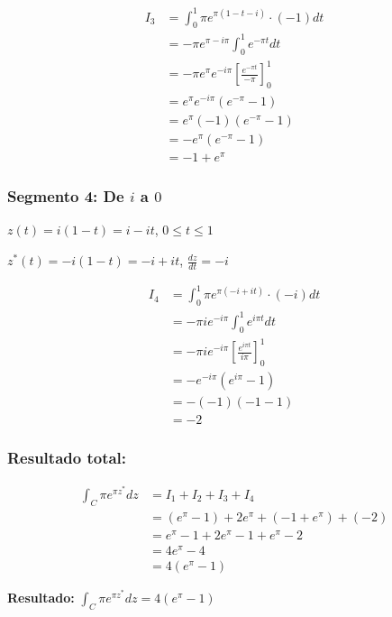 \documentclass{article}
\begin{document}
\begin{align*}
I_3 &= \int_0^1 \pi e^{\pi(1 - t - i)} \cdot (-1) dt \\
    &= -\pi e^{\pi - i\pi} \int_0^1 e^{-\pi t} dt \\
    &= -\pi e^{\pi} e^{-i\pi} \left[\frac{e^{-\pi t}}{-\pi}\right]_0^1 \\
    &= e^{\pi} e^{-i\pi} (e^{-\pi} - 1) \\
    &= e^{\pi} (-1) (e^{-\pi} - 1) \\
    &= -e^{\pi} (e^{-\pi} - 1) \\
    &= -1 + e^{\pi}
\end{align*}

\subsubsection*{Segmento 4: De $i$ a $0$}

$z(t) = i(1 - t) = i - it$, $0 \leq t \leq 1$

$z^*(t) = -i(1 - t) = -i + it$, $\frac{dz}{dt} = -i$

\begin{align*}
I_4 &= \int_0^1 \pi e^{\pi(-i + it)} \cdot (-i) dt \\
    &= -\pi i e^{-i\pi} \int_0^1 e^{i\pi t} dt \\
    &= -\pi i e^{-i\pi} \left[\frac{e^{i\pi t}}{i\pi}\right]_0^1 \\
    &= -e^{-i\pi} (e^{i\pi} - 1) \\
    &= -(-1) (-1 - 1) \\
    &= -2
\end{align*}

\subsubsection*{Resultado total:}

\begin{align*}
\int_C \pi e^{\pi z^*} dz &= I_1 + I_2 + I_3 + I_4 \\
                          &= (e^{\pi} - 1) + 2e^{\pi} + (-1 + e^{\pi}) + (-2) \\
                          &= e^{\pi} - 1 + 2e^{\pi} - 1 + e^{\pi} - 2 \\
                          &= 4e^{\pi} - 4 \\
                          &= 4(e^{\pi} - 1)
\end{align*}

\textbf{Resultado:} $\int_C \pi e^{\pi z^*} dz = 4(e^{\pi} - 1)$
\end{document}
